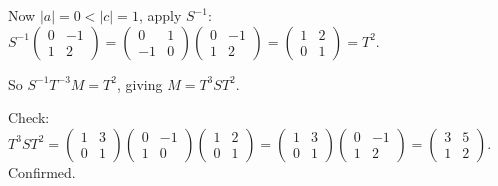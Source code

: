 \documentclass{report}
\begin{document}
\begin{solution}
Now \(|a| = 0 < |c| = 1\), apply \(S^{-1}\): \(S^{-1} \begin{pmatrix} 0 & -1 \\ 1 & 2 \end{pmatrix} = \begin{pmatrix} 0 & 1 \\ -1 & 0 \end{pmatrix} \begin{pmatrix} 0 & -1 \\ 1 & 2 \end{pmatrix} = \begin{pmatrix} 1 & 2 \\ 0 & 1 \end{pmatrix} = T^2\).

So \(S^{-1} T^{-3} M = T^2\), giving \(M = T^3 S T^2\).

Check: \(T^3 S T^2 = \begin{pmatrix} 1 & 3 \\ 0 & 1 \end{pmatrix} \begin{pmatrix} 0 & -1 \\ 1 & 0 \end{pmatrix} \begin{pmatrix} 1 & 2 \\ 0 & 1 \end{pmatrix} = \begin{pmatrix} 1 & 3 \\ 0 & 1 \end{pmatrix} \begin{pmatrix} 0 & -1 \\ 1 & 2 \end{pmatrix} = \begin{pmatrix} 3 & 5 \\ 1 & 2 \end{pmatrix}\). Confirmed.
\end{solution}
\end{document}
